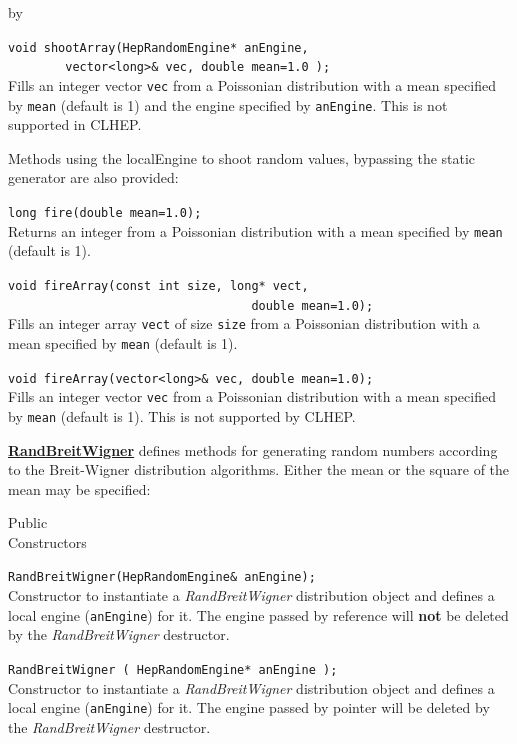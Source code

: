 \documentclass[twoside]{article}
\newcommand{\comp}[1]{\texttt{#1}}%
\newcommand{\entrylabel}[1]{\mbox{\textbf{{#1}}}\hfil}%
\newenvironment{entry}
{\begin{list}{}%
    {\renewcommand{\makelabel}{\entrylabel}%
     \setlength{\labelwidth}{90pt}%
     \setlength{\leftmargin}{\labelwidth}
     \advance\leftmargin by \labelsep%
      }%
    }%
  {\end{list}}
\newcommand{\Entrylabel}[1]%
{\raisebox{0pt}[1ex][0pt]{\makebox[\labelwidth][l]%
    {\parbox[t]{\labelwidth}{\hspace{0pt}\textbf{{#1}}}}}}
\newenvironment{Entry}%
{\renewcommand{\entrylabel}{\Entrylabel}\begin{entry}}%
  {\end{entry}}
\begin{document}
\begin{Entry}
    \verb+void shootArray(HepRandomEngine* anEngine,+\\
    \verb+        vector<long>& vec, double mean=1.0 );+\\
    Fills an integer vector \comp{vec} from a
    Poissonian distribution with a mean specified by \comp{mean}
    (default is 1) and the engine specified by \comp{anEngine}.
    This is not supported in CLHEP.
    
    Methods using the localEngine to shoot random values, bypassing
    the static generator are also provided:

    \verb+long fire(double mean=1.0);+\\
    Returns an integer from a Poissonian distribution with a mean
    specified by \comp{mean} (default is 1).
  
    \verb+void fireArray(const int size, long* vect,+\\
    \verb+                                  double mean=1.0);+\\
    Fills an integer array \comp{vect} of size \comp{size} from a
    Poissonian distribution with a mean specified by \comp{mean}
    (default is 1).

    \verb+void fireArray(vector<long>& vec, double mean=1.0);+\\
    Fills an integer vector \comp{vec} from a
    Poissonian distribution with a mean specified by \comp{mean}
    (default is 1).  This is not supported by CLHEP.
  
    \begin{description}
      \item \underline{\bf RandBreitWigner}  defines methods for generating random
        numbers according to the Breit-Wigner distribution algorithms.
        Either the mean or the square of the mean may be specified:
    \end{description}
    
\item[Public\\ Constructors]

    \verb+RandBreitWigner(HepRandomEngine& anEngine);+\\
    Constructor to instantiate a {\em RandBreitWigner}
    distribution object and defines a local engine (\comp{anEngine})
    for it.  The engine passed by reference will {\bf not} be deleted
    by the {\em RandBreitWigner} destructor.
    
    \verb+RandBreitWigner ( HepRandomEngine* anEngine );+\\
    Constructor to instantiate a {\em RandBreitWigner}
    distribution object and defines a local engine (\comp{anEngine})
    for it.  The engine passed by pointer will be deleted
    by the {\em RandBreitWigner} destructor.


\end{Entry}
\end{document}
